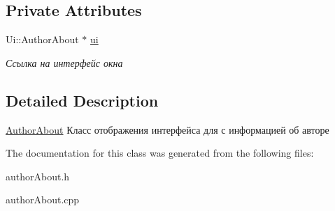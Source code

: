 \subsection*{Private Attributes}
\begin{DoxyCompactItemize}
\item 
\mbox{\label{class_author_about_a874d46dfe21cb5eabf8e94f5a4fe459b}} 
Ui\+::\+Author\+About $\ast$ \mbox{\hyperlink{class_author_about_a874d46dfe21cb5eabf8e94f5a4fe459b}{ui}}
\begin{DoxyCompactList}\small\item\em Ссылка на интерфейс окна \end{DoxyCompactList}\end{DoxyCompactItemize}


\subsection{Detailed Description}
\mbox{\hyperlink{class_author_about}{Author\+About}} Класс отображения интерфейса для с информацией об авторе 

The documentation for this class was generated from the following files\+:\begin{DoxyCompactItemize}
\item 
author\+About.\+h\item 
author\+About.\+cpp\end{DoxyCompactItemize}
